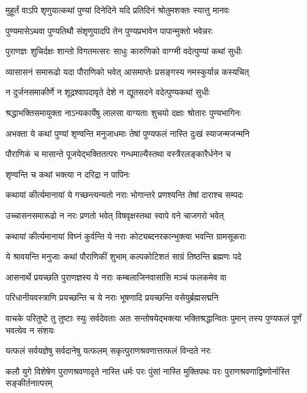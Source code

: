 \twolineshloka
{मुहूर्तं वाऽपि शृणुयात्कथां पुण्यां दिनेदिने}
{यदि प्रतिदिनं श्रोतुमशक्तः स्यात्तु मानवः} %

\twolineshloka
{पुण्यमासेऽथवा पुण्यतिथौ संशृणुयादपि}
{तेन पुण्यप्रभावेन पापान्मुक्तो भवेन्नरः} %

\twolineshloka
{पुराणज्ञः शुचिर्दक्षः शान्तो विगतमत्सरः}
{साधुः कारुणिको वाग्ग्मी वदेत्पुण्यां कथां सुधीः} %

\twolineshloka
{व्यासासनं समारूढो यदा पौराणिको भवेत्}
{आसमाप्तेः प्रसङ्गस्य नमस्कुर्यान्न कस्यचित्} %

\twolineshloka
{न दुर्जनसमाकीर्णे न शूद्रश्वापदावृते}
{देशे न द्यूतसदने वदेत्पुण्यकथां सुधीः} %

\twolineshloka
{श्रद्धाभक्तिसमायुक्ता नाऽन्यकार्येषु लालसा}
{वाग्यताः शुचयो दक्षाः श्रोतारः पुण्यभागिनः} %

\twolineshloka
{अभक्ता ये कथां पुण्यां शृण्वन्ति मनुजाधमाः}
{तेषां पुण्यफलं नास्ति दुःखं स्याजन्मजन्मनि} %

\twolineshloka
{पौराणिकं च मासान्ते पूजयेद्भक्तितत्परः}
{गन्धमाल्यैस्तथा वस्त्रैरलङ्कारैर्धनेन च} %


\onelineshloka
{शृण्वन्ति च कथां भक्त्या न दरिद्रा न पापिनः} %

\twolineshloka
{कथायां कीर्त्यमानायां ये गच्छन्त्यन्यतो नराः}
{भोगान्तरे प्रणश्यन्ति तेषां दाराश्च सम्पदः} %

\twolineshloka
{उच्चासनसमारूढो न नरः प्रणतो भवेत्}
{विषवृक्षस्तथा स्वापे वने चाजगरो भवेत्} %

\twolineshloka
{कथायां कीर्त्यमानायां विघ्नं कुर्वन्ति ये नराः}
{कोट्यब्दनरकान्भुक्त्वा भवन्ति ग्रामसूकराः} %

\twolineshloka
{ये श्रावयन्ति मनुजाः कथां पौराणिकीं शुभाम्}
{कल्पकोटिशतं साग्रं तिष्ठन्ति ब्रह्मणः पदे} %

\twolineshloka
{आसनार्थे प्रयच्छति पुराणज्ञस्य ये नराः}
{कम्बलाजिनवासांसि मञ्चं फलकमेव वा} %

\twolineshloka
{परिधानीयवस्त्राणि प्रयच्छन्ति च ये नराः}
{भूषणादि प्रयच्छन्ति वसेयुर्ब्रह्मसद्मनि} %

\threelineshloka
{वाचके परितुष्टे तु तुष्टाः स्युः सर्वदेवताः}
{अतः सन्तोषयेद्भक्त्या भक्तिश्रद्धान्वितः पुमान्}
{तस्य पुण्यफलं पूर्णं भवत्येव न संशयः} %

\twolineshloka
{यत्फलं सर्वयज्ञेषु सर्वदानेषु यत्फलम्}
{सकृत्पुराणश्रवणात्तत्फलं विन्दते नरः} %

\threelineshloka
{कलौ युगे विशेषेण पुराणश्रवणादृते}
{नास्ति धर्मः परः पुंसां नास्ति मुक्तिपथः परः}
{पुराणश्रवणाद्विष्णोर्नास्ति सङ्कीर्तनात्परम्} %

